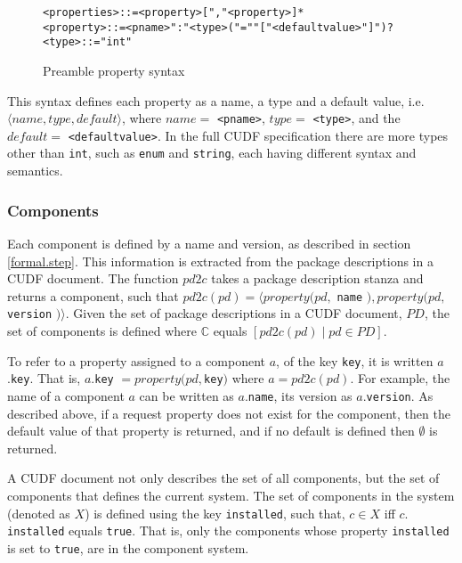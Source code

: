 \begin{figure}[htp] 
\begin{center}
\begin{alltt}
<properties> ::= <property> ["," <property>]*
<property> :: = <pname> ":" <type> ("=" "["<defaultvalue>"]")?
<type> ::= "int"
\end{alltt}
  \caption{Preamble property syntax}
  \label{formal.cudfpropertysyntax}
\end{center}
\end{figure}

This syntax defines each property as a name, a type and a default value, i.e. $\langle name, type, default \rangle$, where $name = $ \verb+<pname>+, $type = $ \verb+<type>+,
and the $default =$ \verb+<defaultvalue>+. 
In the full CUDF specification there are more types other than \verb+int+, such as \verb+enum+ and \verb+string+,
each having different syntax and semantics.

\subsubsection{Components}
Each component is defined by a name and version, as described in section \ref{formal.step}.
This information is extracted from the package descriptions in a CUDF document.
The function $pd2c$ takes a package description stanza and returns a component, such that $pd2c(pd) = \langle property(pd, $ \verb+name+ $), property(pd, $ \verb+version+ $) \rangle$.
Given the set of package descriptions in a CUDF document, $PD$, the set of components is defined where $\mathbb{C}$ equals $[ pd2c(pd) \mid pd \in PD]$.

To refer to a property assigned to a component $a$, of the key \verb+key+, it is written $a$.\verb+key+.
That is, $a$.\verb+key+ $= property(pd, $\verb+key+$)$ where $a = pd2c(pd)$.
For example, the name of a component $a$ can be written as $a$.\verb+name+, its version as $a$.\verb+version+.
As described above, 
if a request property does not exist for the component, then the default value of that property is returned, and if no default is defined then $\emptyset$ is returned.

A CUDF document not only describes the set of all components, but the set of components that defines the current system.
The set of components in the system (denoted as $X$) is defined using the key \verb+installed+,
such that, $c \in X$ iff  $c.$\verb+installed+ equals \verb+true+.
That is, only the components whose property \verb+installed+ is set to \verb+true+, are in the component system.

